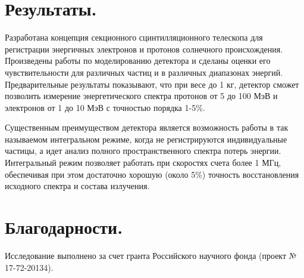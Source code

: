 \documentclass[12pt, a4paper, notitlepage, onecolumn]{article}
\begin{document}

\section*{Результаты.}
Разработана концепция секционного сцинтилляционного телескопа для регистрации энергичных электронов и протонов солнечного происхождения. Произведены работы по моделированию детектора и сделаны оценки его чувствительности для различных частиц и в различных диапазонах энергий. Предварительные результаты показывают, что при весе до 1 кг, детектор сможет позволить измерение энергетического спектра протонов от 5 до 100 МэВ и электронов от 1 до 10 МэВ с точностью порядка 1-5\%.

Существенным преимуществом детектора является возможность работы в так называемом интегральном режиме, когда не регистрируются индивидуальные частицы, а идет анализ полного пространственного спектра потерь энергии. Интегральный режим позволяет работать при скоростях счета более 1 МГц, обеспечивая при этом достаточно хорошую (около 5\%) точность восстановления исходного спектра и состава излучения.

\section*{Благодарности.}
Исследование выполнено за счет гранта Российского научного фонда (проект № 17-72-20134).



% 
% 




\end{document}
